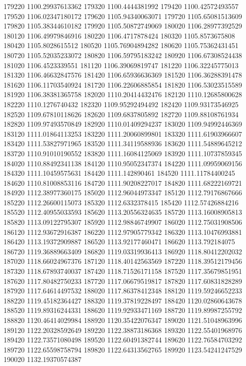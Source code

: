 {179220 1100.29937613362
179320 1100.4444381992
179420 1100.42572493557
179520 1106.02347180172
179620 1105.94340063071
179720 1105.65081513609
179820 1105.38344610182
179920 1105.50872749069
180020 1106.28977392529
180120 1106.49979846916
180220 1106.4717878424
180320 1105.8573675808
180420 1105.8028615512
180520 1105.76904894282
180620 1105.75362431451
180720 1105.52035233072
180820 1106.59795183242
180920 1106.67308524438
181020 1106.4523339551
181120 1106.39069819747
181220 1106.32245775013
181320 1106.46632847576
181420 1106.65936636369
181520 1106.36288391478
181620 1106.11703540924
181720 1106.22606885854
181820 1106.53023515589
181920 1106.38381365758
182020 1110.20414432476
182120 1110.12685800628
182220 1110.1276740432
182320 1109.95292494492
182420 1109.93173546925
182520 1109.67810118626
182620 1109.6837805892
182720 1109.88108761934
182820 1109.97493570849
182920 1110.01409294237
183020 1109.94992446369
183120 1111.01864113253
183220 1111.20060899801
183320 1111.61903966607
183420 1111.53827971965
183520 1111.34119588936
183620 1111.54889645212
183720 1110.91010190552
183820 1111.16084125069
183920 1111.10737859345
184020 1110.88492341138
184120 1110.95052347374
184220 1111.09959069156
184320 1111.10459575631
184420 1111.142890461
184520 1111.11784400245
184620 1110.81008853116
184720 1111.90208227017
184820 1111.68222169721
184920 1112.38977360175
185020 1112.96044973347
185120 1112.79176867666
185220 1112.26600115073
185320 1112.6332378415
185420 1112.57426884216
185520 1112.40955033593
185620 1113.20556324635
185720 1113.16008905813
185820 1113.09122795307
185920 1112.98846749907
186020 1112.75031908506
186120 1112.93672916387
186220 1112.97905779342
186320 1113.10476993881
186420 1113.19372909887
186520 1113.92177460471
186620 1113.792184075
186720 1119.36889663409
186820 1119.03319936413
186920 1118.80412202032
187020 1118.66024967376
187120 1118.40142563569
187220 1118.39512179456
187320 1118.67893740037
187420 1118.71526171158
187520 1117.35679851951
187620 1117.80482750233
187720 1117.06679519817
187820 1117.60831828289
187920 1117.64614497532
188020 1117.86378412348
188120 1119.59246652233
188220 1119.45182364427
188320 1119.37819228497
188420 1120.02860643678
188520 1119.89316244331
188620 1119.92933471169
188720 1119.89987255792
188820 1120.46414029984
188920 1120.35422076347
189020 1121.51048963996
189120 1122.20328592649
189220 1122.38873186368
189320 1122.55401968976
189420 1122.73571080498
189520 1122.60491382744
189620 1122.76584703292
189720 1122.65598758794
189820 1122.64313562765
189920 1123.54241247529
190020 1132.19370574387
}
